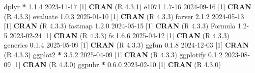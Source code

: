 \documentclass[
]{article}
\newenvironment{Shaded}{\begin{snugshade}}{\end{snugshade}}
\newcommand{\DecValTok}[1]{\textcolor[rgb]{0.00,0.00,0.81}{#1}}
\newcommand{\FloatTok}[1]{\textcolor[rgb]{0.00,0.00,0.81}{#1}}
\newcommand{\FunctionTok}[1]{\textcolor[rgb]{0.13,0.29,0.53}{\textbf{#1}}}
\newcommand{\NormalTok}[1]{#1}
\newcommand{\SpecialCharTok}[1]{\textcolor[rgb]{0.81,0.36,0.00}{\textbf{#1}}}
\begin{document}
\begin{Shaded}
\begin{Highlighting}[]
\NormalTok{ dplyr         }\SpecialCharTok{*} \DecValTok{1}\NormalTok{.}\FloatTok{1.4}   \DecValTok{2023{-}11{-}17}\NormalTok{ [}\DecValTok{1}\NormalTok{] }\FunctionTok{CRAN}\NormalTok{ (R }\DecValTok{4}\NormalTok{.}\FloatTok{3.1}\NormalTok{)}
\NormalTok{ e1071           }\FloatTok{1.7}\DecValTok{{-}16}  \DecValTok{2024{-}09{-}16}\NormalTok{ [}\DecValTok{1}\NormalTok{] }\FunctionTok{CRAN}\NormalTok{ (R }\DecValTok{4}\NormalTok{.}\FloatTok{3.3}\NormalTok{)}
\NormalTok{ evaluate        }\DecValTok{1}\NormalTok{.}\FloatTok{0.3}   \DecValTok{2025{-}01{-}10}\NormalTok{ [}\DecValTok{1}\NormalTok{] }\FunctionTok{CRAN}\NormalTok{ (R }\DecValTok{4}\NormalTok{.}\FloatTok{3.3}\NormalTok{)}
\NormalTok{ farver          }\DecValTok{2}\NormalTok{.}\FloatTok{1.2}   \DecValTok{2024{-}05{-}13}\NormalTok{ [}\DecValTok{1}\NormalTok{] }\FunctionTok{CRAN}\NormalTok{ (R }\DecValTok{4}\NormalTok{.}\FloatTok{3.3}\NormalTok{)}
\NormalTok{ fastmap         }\DecValTok{1}\NormalTok{.}\FloatTok{2.0}   \DecValTok{2024{-}05{-}15}\NormalTok{ [}\DecValTok{1}\NormalTok{] }\FunctionTok{CRAN}\NormalTok{ (R }\DecValTok{4}\NormalTok{.}\FloatTok{3.3}\NormalTok{)}
\NormalTok{ Formula         }\FloatTok{1.2}\DecValTok{{-}5}   \DecValTok{2023{-}02{-}24}\NormalTok{ [}\DecValTok{1}\NormalTok{] }\FunctionTok{CRAN}\NormalTok{ (R }\DecValTok{4}\NormalTok{.}\FloatTok{3.3}\NormalTok{)}
\NormalTok{ fs              }\DecValTok{1}\NormalTok{.}\FloatTok{6.6}   \DecValTok{2025{-}04{-}12}\NormalTok{ [}\DecValTok{1}\NormalTok{] }\FunctionTok{CRAN}\NormalTok{ (R }\DecValTok{4}\NormalTok{.}\FloatTok{3.3}\NormalTok{)}
\NormalTok{ generics        }\DecValTok{0}\NormalTok{.}\FloatTok{1.4}   \DecValTok{2025{-}05{-}09}\NormalTok{ [}\DecValTok{1}\NormalTok{] }\FunctionTok{CRAN}\NormalTok{ (R }\DecValTok{4}\NormalTok{.}\FloatTok{3.3}\NormalTok{)}
\NormalTok{ ggfun           }\DecValTok{0}\NormalTok{.}\FloatTok{1.8}   \DecValTok{2024{-}12{-}03}\NormalTok{ [}\DecValTok{1}\NormalTok{] }\FunctionTok{CRAN}\NormalTok{ (R }\DecValTok{4}\NormalTok{.}\FloatTok{3.3}\NormalTok{)}
\NormalTok{ ggplot2       }\SpecialCharTok{*} \DecValTok{3}\NormalTok{.}\FloatTok{5.2}   \DecValTok{2025{-}04{-}09}\NormalTok{ [}\DecValTok{1}\NormalTok{] }\FunctionTok{CRAN}\NormalTok{ (R }\DecValTok{4}\NormalTok{.}\FloatTok{3.3}\NormalTok{)}
\NormalTok{ ggplotify       }\DecValTok{0}\NormalTok{.}\FloatTok{1.2}   \DecValTok{2023{-}08{-}09}\NormalTok{ [}\DecValTok{1}\NormalTok{] }\FunctionTok{CRAN}\NormalTok{ (R }\DecValTok{4}\NormalTok{.}\FloatTok{3.0}\NormalTok{)}
\NormalTok{ ggpubr        }\SpecialCharTok{*} \DecValTok{0}\NormalTok{.}\FloatTok{6.0}   \DecValTok{2023{-}02{-}10}\NormalTok{ [}\DecValTok{1}\NormalTok{] }\FunctionTok{CRAN}\NormalTok{ (R }\DecValTok{4}\NormalTok{.}\FloatTok{3.0}\NormalTok{)}

\end{Highlighting}
\end{Shaded}
\end{document}
